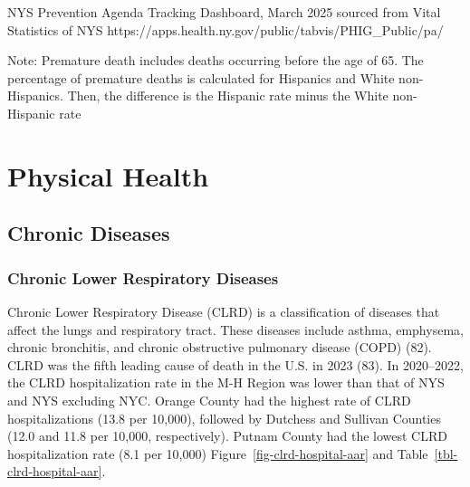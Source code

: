 \documentclass[
  english,
  letterpaper,
]{report}
\begin{document}
\begin{tcolorbox}[enhanced jigsaw, breakable, leftrule=.75mm, title=\textcolor{quarto-callout-note-color}{\faInfo}\hspace{0.5em}{Source}, bottomrule=.15mm, opacityback=0, left=2mm, colback=white, bottomtitle=1mm, coltitle=black, colbacktitle=quarto-callout-note-color!10!white, colframe=quarto-callout-note-color-frame, opacitybacktitle=0.6, toptitle=1mm, titlerule=0mm, arc=.35mm, rightrule=.15mm, toprule=.15mm]

NYS Prevention Agenda Tracking Dashboard, March 2025 sourced from Vital
Statistics of NYS
https://apps.health.ny.gov/public/tabvis/PHIG\_Public/pa/

\end{tcolorbox}

\begin{tcolorbox}[enhanced jigsaw, breakable, leftrule=.75mm, title=\textcolor{quarto-callout-note-color}{\faInfo}\hspace{0.5em}{Note}, bottomrule=.15mm, opacityback=0, left=2mm, colback=white, bottomtitle=1mm, coltitle=black, colbacktitle=quarto-callout-note-color!10!white, colframe=quarto-callout-note-color-frame, opacitybacktitle=0.6, toptitle=1mm, titlerule=0mm, arc=.35mm, rightrule=.15mm, toprule=.15mm]

Note: Premature death includes deaths occurring before the age of 65.
The percentage of premature deaths is calculated for Hispanics and White
non-Hispanics. Then, the difference is the Hispanic rate minus the White
non-Hispanic rate

\end{tcolorbox}

\section{Physical Health}\label{physical-health}

\subsection{Chronic Diseases}\label{chronic-diseases}

\subsubsection{Chronic Lower Respiratory
Diseases}\label{chronic-lower-respiratory-diseases}

Chronic Lower Respiratory Disease (CLRD) is a classification of diseases
that affect the lungs and respiratory tract. These diseases include
asthma, emphysema, chronic bronchitis, and chronic obstructive pulmonary
disease (COPD) (82). CLRD was the fifth leading cause of death in the
U.S. in 2023 (83). In 2020--2022, the CLRD hospitalization rate in the
M-H Region was lower than that of NYS and NYS excluding NYC. Orange
County had the highest rate of CLRD hospitalizations (13.8 per 10,000),
followed by Dutchess and Sullivan Counties (12.0 and 11.8 per 10,000,
respectively). Putnam County had the lowest CLRD hospitalization rate
(8.1 per 10,000) Figure~\ref{fig-clrd-hospital-aar} and
Table~\ref{tbl-clrd-hospital-aar}.
\end{document}
